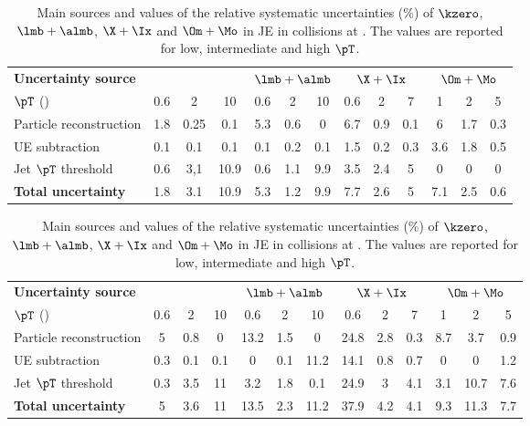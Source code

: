 \documentclass[ALICE,manyauthors]{cernphprep}
\begin{document}
\begin{table}[!ht]
	\begin{center}
		\caption{Main sources and values of the relative systematic uncertainties (\%) of $\kzero$, $\lmb + \almb$, $\X + \Ix$ and $\Om + \Mo$ in JE in \pp collisions at \thirteen.
			The values are reported for low, intermediate and high $\pT$.}
		\label{tab:ppJEUncer}
		\begin{tabularx}{\textwidth}{@{} lCCCCCCCCCCCC @{}}
			\toprule
			\textbf{Uncertainty source} & 
			& 
			& 
			&  \\
			\cmidrule(lr){2-4} \cmidrule(lr){5-7} \cmidrule(lr){8-10} \cmidrule(lr){11-13}
			$\pT$ (\GeVc) & 0.6 & 2 &10  & 0.6 & 2 & 10    & 0.6 & 2 & 7   & 1& 2 & 5 \\
			\midrule
			Particle reconstruction& 1.8& 0.25& 0.1& 5.3& 0.6& 0& 6.7& 0.9& 0.1& 6& 1.7& 0.3\\
			UE subtraction& 0.1& 0.1& 0.1& 0.1& 0.2& 0.1& 1.5& 0.2& 0.3& 3.6& 1.8& 0.5\\
			Jet $\pT$ threshold& 0.6& 3,1& 10.9& 0.6& 1.1& 9.9& 3.5& 2.4& 5& 0& 0& 0\\
			\midrule
			\textbf{Total uncertainty}& 1.8& 3.1& 10.9& 5.3& 1.2& 9.9& 7.7& 2.6& 5& 7.1& 2.5& 0.6 \\
			\bottomrule
		\end{tabularx}
	\end{center}
\end{table}

\begin{table}[!ht]
	\begin{center}
		\caption{Main sources and values of the relative systematic uncertainties (\%) of $\kzero$, $\lmb + \almb$, $\X + \Ix$ and $\Om + \Mo$ in JE in \pPb collisions at \fivenn.
			The values are reported for low, intermediate and high $\pT$.}
		\label{tab:pPbJEUncer}
		\begin{tabularx}{\textwidth}{@{} lCCCCCCCCCCCC @{}}
			\toprule
			\textbf{Uncertainty source} & 
			& 
			& 
			&  \\
			\cmidrule(lr){2-4} \cmidrule(lr){5-7} \cmidrule(lr){8-10} \cmidrule(lr){11-13}
			$\pT$ (\GeVc) & 0.6 & 2 &10  & 0.6 & 2 & 10    & 0.6 & 2 & 7   & 1& 2 & 5 \\
			\midrule
			Particle reconstruction& 5& 0.8& 0& 13.2& 1.5& 0& 24.8& 2.8& 0.3& 8.7& 3.7& 0.9\\
			UE subtraction& 0.3& 0.1& 0.1& 0& 0.1& 11.2& 14.1& 0.8& 0.7& 0& 0& 1.2\\
			Jet $\pT$ threshold& 0.3& 3.5& 11& 3.2& 1.8& 0.1& 24.9&  3& 4.1& 3.1& 10.7& 7.6\\
			\midrule
			\textbf{Total uncertainty}& 5& 3.6& 11& 13.5& 2.3& 11.2& 37.9& 4.2& 4.1& 9.3& 11.3& 7.7 \\
			\bottomrule
		\end{tabularx}
	\end{center}
\end{table}
\end{document}
